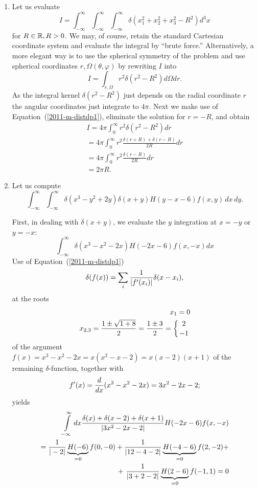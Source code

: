 {\begin{enumerate}
\item
Let us evaluate
\begin{equation}
I=
\int_{-\infty}^\infty
\int_{-\infty}^\infty
\int_{-\infty}^\infty
\delta (x_1^2+x_2^2+x_3^2-R^2) d^3x
\end{equation}
for  $R \in {\Bbb R}, R >0 $.
We may, of course, retain the standard Cartesian coordinate system and evaluate the integral by ``brute force.''
Alternatively,
a more elegant way is to use the spherical symmetry of the problem and use spherical coordinates $r, \Omega (\theta ,\varphi )$ by rewriting $I$
into
\begin{equation}
I=  \int_{r,\Omega} r^2  \delta (r^2-R^2) d\Omega dr.
\end{equation}
As the integral kernel $\delta (r^2-R^2)$ just depends on the radial coordinate $r$
the angular coordinates just integrate to $4\pi$.
Next we make use of Equation~(\ref{2011-m-distdp1}), eliminate the solution for $r=-R$, and obtain
\begin{equation}
\begin{split}
I= 4\pi   \int_0^\infty r^2  \delta (r^2-R^2)  dr \\
 =  4\pi   \int_0^\infty  r^2 \frac{\delta (r+R) + \delta (r-R)}{2R}  dr \\
  =   4\pi   \int_0^\infty  r^2 \frac{\delta (r-R)}{2R}  dr \\
  =   2 \pi R.
\end{split}
\end{equation}

\item
Let us compute
\begin{equation}
\int_{-\infty}^\infty \int_{-\infty}^\infty  \delta
 (x^3-y^2+2y)\delta (x+y)H (y-x-6)f(x,y) \,dx\,dy.
\end{equation}

First, in dealing with
$\delta(x+y)$, we evaluate the $y$ integration at $x=-y$ or $y=-x$:
$$
   \int_{-\infty}^\infty \delta(x^3-x^2-2x)H(-2x-6)f(x,-x)  dx
$$
Use of Equation~(\ref{2011-m-distdp1})
$$
   \delta(f(x))=\sum_{i}{1\over|f'(x_i)|}\delta(x-x_i),
$$
at the roots
\begin{equation}
\begin{split}
   x_1=0\\
   x_{2,3}={1\pm\sqrt{1+8}\over 2}={1\pm3\over2}=\left\{{2\atop-1}\right.
\end{split}
\end{equation}
of the argument $f(x)=x^3-x^2-2x=x(x^2-x-2)=x(x-2)(x+1)$ of the remaining $\delta$-function,
together with
$$
 f'(x)=  {d\over dx}(x^3-x^2-2x)=3x^2-2x-2 ;
$$
yields
\begin{equation}
\begin{split}
   \int\limits_{-\infty}^\infty dx
         {\delta(x)+\delta(x-2)+\delta(x+1)\over|3x^2-2x-2|}
         H(-2x-6)f(x,-x) \\
   ={1\over|-2|}\underbrace{H(-6)}_{ =0 }f(0,-0)+
      {1\over|12-4-2|}\underbrace{H(-4-6)}_{ =0 }f(2,-2)  +\\
   +\ {1\over|3+2-2|}\underbrace{H(2-6)}_{ =0 }f(-1,1)
=0
\end{split}
\end{equation}



\end{enumerate}}
